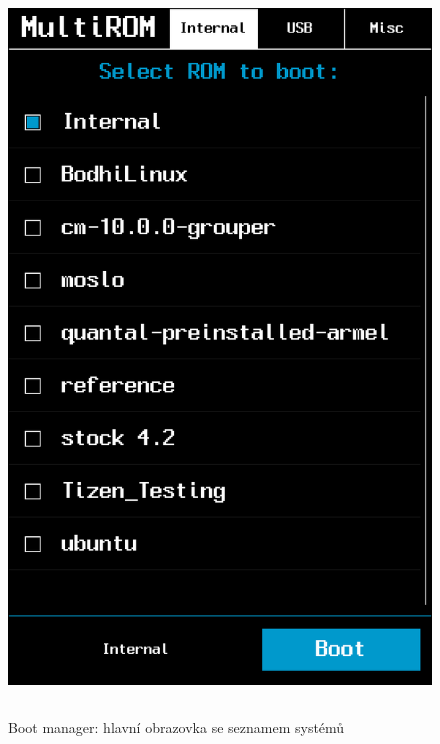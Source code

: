 \documentclass[12pt, a4paper, oneside]{article}
\begin{document}
\addtolength{\textheight}{-70pt}
\begin{figure}[H]
\begin{center}
 \includegraphics[height=550pt]{img/boot_manager.png}
\caption{Boot manager: hlavní obrazovka se seznamem systémů}
\end{center}
\end{figure}

\newpage
\voffset=0pt
\addtolength{\footskip}{-70pt}
\end{document}
